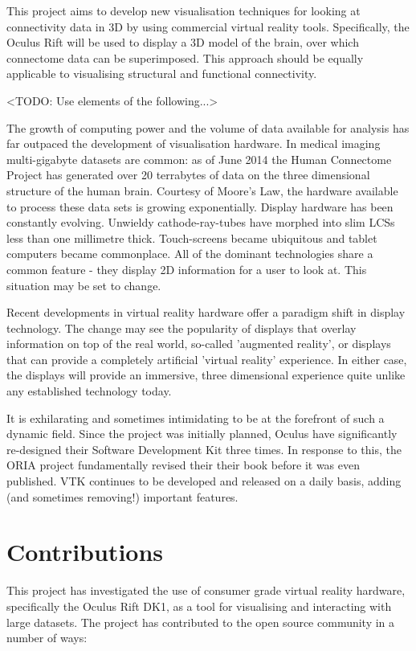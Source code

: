 \documentclass[MSc,paper=a4,pagesize=auto]{icldt}
\begin{document}
This project aims to develop new visualisation techniques for looking at connectivity data in 3D by using commercial virtual reality tools. Specifically, the Oculus Rift will be used to display a 3D model of the brain, over which connectome data can be superimposed. This approach should be equally applicable to visualising structural and functional connectivity. 

<TODO: Use elements of the following...>

The growth of computing power and the volume of data available for analysis has far outpaced the development of visualisation hardware. In medical imaging multi-gigabyte datasets are common: as of June 2014 the Human Connectome Project has generated over 20 terrabytes of data on the three dimensional structure of the human brain. Courtesy of Moore's Law, the hardware available to process these data sets is growing exponentially. Display hardware has been constantly evolving. Unwieldy cathode-ray-tubes have morphed into slim LCSs less than one millimetre thick. Touch-screens became ubiquitous and tablet computers became commonplace. All of the dominant technologies share a common feature - they display 2D information for a user to look at. This situation may be set to change. 

Recent developments in virtual reality hardware offer a  paradigm shift in display technology. The change may see the popularity of displays that overlay information on top of the real world, so-called 'augmented reality', or displays that can provide a completely artificial 'virtual reality' experience. In either case, the displays will provide an immersive, three dimensional experience quite unlike any established technology today.

It is exhilarating and sometimes intimidating to be at the forefront of such a dynamic field. Since the project was initially planned, Oculus have significantly re-designed their Software Development Kit three times. In response to this, the ORIA project fundamentally revised their their book before it was even published. VTK continues to be developed and released on a daily basis, adding (and sometimes removing!) important features.

\newpage
\section{Contributions}
This project has investigated the use of consumer grade virtual reality hardware, specifically the Oculus Rift DK1, as a tool for visualising and interacting with large datasets. The project has contributed to the open source community in a number of ways:
\end{document}
